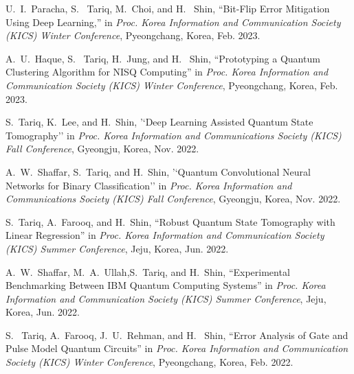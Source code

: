 \documentclass[10pt]{article}
\begin{document}
\begin{enumerate}[ {[}1{]} ]
\item
U.~I.~Paracha, S.~ Tariq, M.~Choi, and H.~ Shin, 
``Bit-Flip Error Mitigation Using Deep Learning,''
in
\emph{Proc. Korea Information and Communication Society (KICS) Winter Conference},
Pyeongchang, Korea, Feb. 2023.

\item
A.~U.~Haque, S.~ Tariq, H.~Jung, and H.~ Shin, 
``Prototyping a Quantum Clustering Algorithm for
NISQ Computing''
in
\emph{Proc. Korea Information and Communication Society (KICS) Winter Conference},
Pyeongchang, Korea, Feb. 2023.

\item
S.~Tariq, K.~Lee, and H.~Shin, '`Deep Learning Assisted Quantum State Tomography'' in \emph{Proc. Korea Information and Communications Society (KICS) Fall Conference}, Gyeongju, Korea, Nov. 2022.

\item
A.~W.~Shaffar, S.~Tariq, and H.~Shin, '`Quantum Convolutional Neural Networks
for Binary Classification'' in \emph{Proc. Korea Information and Communications Society (KICS) Fall Conference}, Gyeongju, Korea, Nov. 2022.

\item 
S.~Tariq, A.~Farooq, and
H.~Shin, ``Robust Quantum State Tomography with
Linear Regression'' in \emph{Proc. Korea Information and Communication Society (KICS) Summer Conference},
Jeju, Korea, Jun. 2022.

\item 
A.~W.~Shaffar, M.~A.~Ullah,S.~Tariq, and
H.~Shin, ``Experimental Benchmarking Between IBM
Quantum Computing Systems'' in \emph{Proc. Korea Information and Communication Society (KICS) Summer Conference},
Jeju, Korea, Jun. 2022.


\item
 S.~ Tariq, A.~Farooq, J.~U.~Rehman, and H.~ Shin, 
``Error Analysis of Gate and Pulse
Model Quantum Circuits''
in
\emph{Proc. Korea Information and Communication Society (KICS) Winter Conference},
Pyeongchang, Korea, Feb. 2022.



\end{enumerate}


\end{document}
